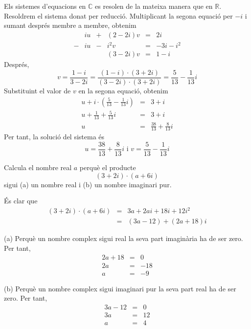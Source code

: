 \begin{solucio}
Els sistemes d’equacions en $\mathbb{C}$ es resolen de la mateixa manera
que en $\mathbb{R}$. Resoldrem el sistema donat per reducció.
Multiplicant la segona equació per $-i$ i sumant després membre a membre, obtenim
\begin{equation*}
\begin{array}{llllll}
& iu & + & (2-2i)v & = & 2i \\
- & iu & - & i^{2}v & = & -3i-i^{2} \\
&  &  & (3-2i)v & = & 1-i
\end{array}
\end{equation*}
Després,
\begin{equation*}
v=\frac{1-i}{3-2i}=\frac{(1-i)\cdot (3+2i)}{(3-2i)\cdot (3+2i)}=\frac{5}{13}-
\frac{1}{13}i
\end{equation*}
Substituint el valor de $v$ en la segona equació, obtenim
\begin{eqnarray*}
u+i\cdot \left( \frac{5}{13}-\frac{1}{13}i\right) &=&3+i \\
u+\frac{1}{13}+\frac{5}{13}i &=&3+i \\
u &=&\frac{38}{13}+\frac{8}{13}i
\end{eqnarray*}
Per tant, la solució del sistema és
\begin{equation*}
u=\frac{38}{13}+\frac{8}{13}i\text{ \ \ i \ \ }v=\frac{5}{13}-\frac{1}{13}i
\end{equation*}
\end{solucio}

\begin{exemple}
Calcula el nombre real $a$ perquè el producte
\begin{equation*}
(3+2i)\cdot (a+6i)
\end{equation*}
sigui (a) un nombre real i (b) un nombre imaginari pur.
\end{exemple}

\begin{solucio}
És clar que
\begin{eqnarray*}
(3+2i)\cdot (a+6i) &=&3a+2ai+18i+12i^{2} \\
&=&(3a-12)+(2a+18)i
\end{eqnarray*}

(a) Perquè un nombre complex sigui real la seva part imaginària ha de ser
zero. Per tant,
\begin{eqnarray*}
2a+18 &=&0 \\
2a &=&-18 \\
a &=&-9
\end{eqnarray*}

(b) Perquè un nombre complex sigui imaginari pur la seva part real ha de
ser zero. Per tant,
\begin{eqnarray*}
3a-12 &=&0 \\
3a &=&12 \\
a &=&4
\end{eqnarray*}
\end{solucio}

